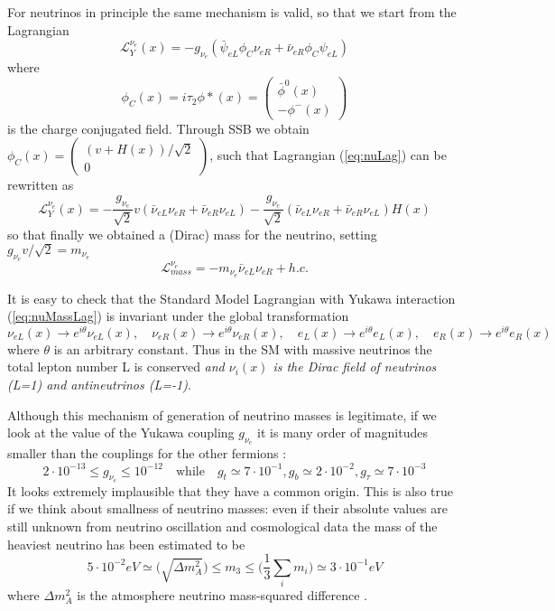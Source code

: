 \documentclass{subnucbo}
\begin{document}
For neutrinos in principle the same mechanism is valid, so that we start from the Lagrangian
\begin{equation}
\label{eq:nuLag}
\mathcal{L}_Y^{\nu_e}(x)=-g_{\nu_e}(\bar{\psi}_{eL}\phi_C \nu_{eR}+\bar{\nu}_{eR}\phi_C \psi_{eL})
\end{equation}
where
\begin{equation}
\phi_C(x)=i\tau_2\phi*(x)=\begin{pmatrix}\bar{\phi}^0(x) \\ -\phi^-(x)\end{pmatrix}
\end{equation}
is the charge conjugated field. Through SSB we obtain $\phi_C(x)=\begin{pmatrix}(v+H(x))/\sqrt{2}\\0\end{pmatrix}$, such that Lagrangian (\ref{eq:nuLag}) can be rewritten as
\begin{equation}
\label{eq:nuMassLag}
\mathcal{L}_Y^{\nu_e}(x)=-\frac{g_{\nu_e}}{\sqrt{2}}v(\bar{\nu}_{eL}\nu_{eR}+\bar{\nu}_{eR}\nu_{eL})-\frac{g_{\nu_e}}{\sqrt{2}}(\bar{\nu}_{eL}\nu_{eR}+\bar{\nu}_{eR}\nu_{eL})H(x)
\end{equation}
so that finally we obtained a (Dirac) mass for the neutrino, setting $g_{\nu_e}v/\sqrt{2}=m_{\nu_e}$
\begin{equation}
\mathcal{L}_{mass}^{\nu_e}=-m_{\nu_e}\bar{\nu}_{eL}\nu_{eR}+h.c.
\end{equation}

It is easy to check that the Standard Model Lagrangian with Yukawa interaction (\ref{eq:nuMassLag}) is invariant under the global transformation
\[
\nu_{eL}(x)\rightarrow e^{i\theta}\nu_{eL}(x),\quad\nu_{eR}(x)\rightarrow e^{i\theta}\nu_{eR}(x),
\quad e_L(x)\rightarrow e^{i\theta}e_L(x),\quad e_R(x)\rightarrow e^{i\theta}e_R(x)
\]
where $\theta$ is an arbitrary constant. Thus in the SM with massive neutrinos the total lepton number L is conserved  \emph{and $\nu_i(x)$ is the Dirac field of neutrinos (L=1) and antineutrinos (L=-1)}.

Although this mechanism of generation of neutrino masses is legitimate, if we look at the value of the Yukawa coupling $g_{\nu_e}$ it is many order of magnitudes smaller than the couplings for the other fermions \cite{ref:Bil}:
\[
2\cdot10^{-13}\leq g_{\nu_e}\leq10^{-12} \quad \text{while}\quad g_t\simeq7\cdot10^{-1}, g_b\simeq2\cdot10^{-2}, g_{\tau}\simeq7\cdot10^{-3}
\]
It looks extremely implausible that they have a common origin. This is also true if we think about smallness of neutrino masses: even if their absolute values are still unknown from neutrino oscillation and cosmological data the mass of the heaviest neutrino has been estimated to be
\[
5\cdot10^{-2}eV\simeq\biggl(\sqrt{\Delta m^2_A}\biggr)\leq m_3\leq\biggl(\frac{1}{3}\sum_im_i\biggr)\simeq3\cdot10^{-1}eV
\]
where $\Delta m^2_A$ is the atmosphere neutrino mass-squared difference \cite{ref:Bil}.
\end{document}
